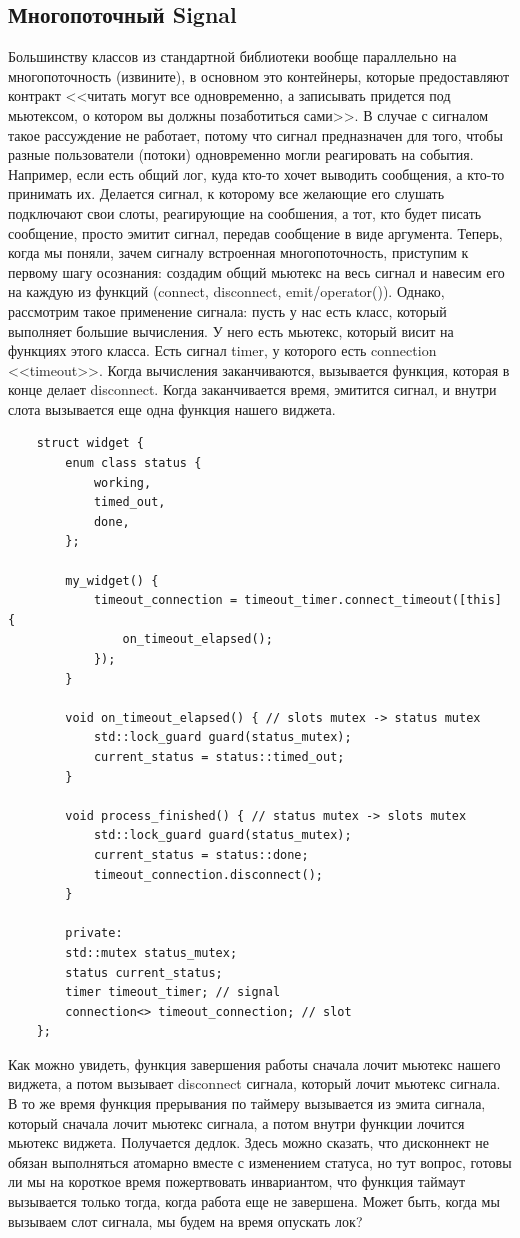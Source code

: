 \documentclass[12pt, a4paper]{article}
\begin{document}
\subsection{Многопоточный Signal}
Большинству классов из стандартной библиотеки вообще параллельно на многопоточность (извините), в основном это контейнеры, которые предоставляют контракт <<читать могут все одновременно, а записывать придется под мьютексом, о котором вы должны позаботиться сами>>. В случае с сигналом такое рассуждение не работает, потому что сигнал предназначен для того, чтобы разные пользователи (потоки) одновременно могли реагировать на события. Например, если есть общий лог, куда кто-то хочет выводить сообщения, а кто-то принимать их. Делается сигнал, к которому все желающие его слушать подключают свои слоты, реагирующие на сообшения, а тот, кто будет писать сообщение, просто эмитит сигнал, передав сообщение в виде аргумента. Теперь, когда мы поняли, зачем сигналу встроенная многопоточность, приступим к первому шагу осознания: создадим общий мьютекс на весь сигнал и навесим его на каждую из функций (connect, disconnect, emit/operator()). Однако, рассмотрим такое применение сигнала: пусть у нас есть класс, который выполняет большие вычисления. У него есть мьютекс, который висит на функциях этого класса. Есть сигнал timer, у которого есть connection <<timeout>>. Когда вычисления заканчиваются, вызывается функция, которая в конце делает disconnect. Когда заканчивается время, эмитится сигнал, и внутри слота вызывается еще одна функция нашего виджета.
\begin{verbatim}
	struct widget {
		enum class status {
			working,
			timed_out,
			done,
		};
		
		my_widget() {
			timeout_connection = timeout_timer.connect_timeout([this] {
				on_timeout_elapsed();
			});
		}
		
		void on_timeout_elapsed() { // slots mutex -> status mutex
			std::lock_guard guard(status_mutex);
			current_status = status::timed_out;
		}
		
		void process_finished() { // status mutex -> slots mutex
			std::lock_guard guard(status_mutex);
			current_status = status::done;
			timeout_connection.disconnect();
		}
		
		private:
		std::mutex status_mutex;
		status current_status;
		timer timeout_timer; // signal
		connection<> timeout_connection; // slot
	};
\end{verbatim}
Как можно увидеть, функция завершения работы сначала лочит мьютекс нашего виджета, а потом вызывает disconnect сигнала, который лочит мьютекс сигнала. В то же время функция прерывания по таймеру вызывается из эмита сигнала, который сначала лочит мьютекс сигнала, а потом внутри функции лочится мьютекс виджета. Получается дедлок. Здесь можно сказать, что дисконнект не обязан выполняться атомарно вместе с изменением статуса, но тут вопрос, готовы ли мы на короткое время пожертвовать инвариантом, что функция таймаут вызывается только тогда, когда работа еще не завершена. Может быть, когда мы вызываем слот сигнала, мы будем на время опускать лок?
\end{document}

